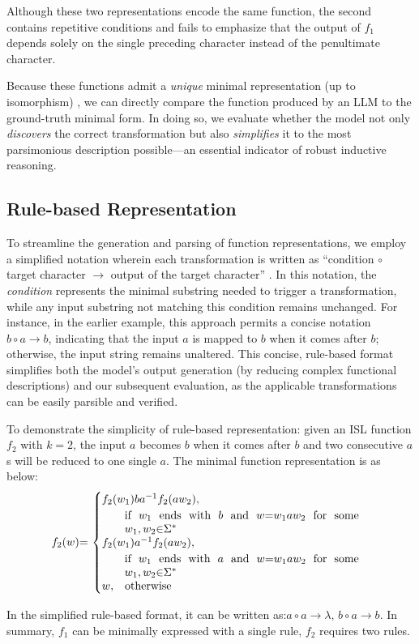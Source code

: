 Although these two representations encode the same function, the second contains repetitive conditions and fails to emphasize that the output of $f_1$ depends solely on the single preceding character instead of the penultimate character. 

Because these functions admit a \emph{unique} minimal representation (up to isomorphism) \citep{chandlee2014learning, oncina1991inductive}, we can directly compare the function produced by an LLM to the ground-truth minimal form. In doing so, we evaluate whether the model not only \emph{discovers} the correct transformation but also \emph{simplifies} it to the most parsimonious description possible—an essential indicator of robust inductive reasoning.

\subsection{Rule-based Representation}
To streamline the generation and parsing of function representations, we employ a simplified notation wherein each transformation is written as ``condition $\circ$ target character $\to$ output of the target character'' \citep{bird1994one}.  In this notation, the \emph{condition} represents the minimal substring needed to trigger a transformation, while any input substring not matching this condition remains unchanged. For instance, in the earlier example, this approach permits a concise notation $b\circ a\to b$, indicating that the input $a$ is mapped to $b$ when it comes after $b$; otherwise, the input string remains unaltered. This concise, rule-based format simplifies both the model's output generation (by reducing complex functional descriptions) and our subsequent evaluation, as the applicable transformations can be easily parsible and verified.

To demonstrate the simplicity of rule-based representation: given an ISL function $f_2$ with $k=2$, the input $a$ becomes $b$ when it comes after $b$ and two consecutive $a$s will be reduced to one single $a$. The minimal function representation is as below:
\begin{equation}
\hspace{-3mm} f_2(w) {=}\,
  \begin{cases}
 f_2(w_1)ba^{-1}f_2(aw_2), \\
 \quad\quad \parbox[t]{0.6\linewidth}{
        if $w_1$ ends with $b$ and 
        $w {=}w_1aw_2$ for some $w_1, w_2 {\in} \Sigma^*$
      }\\
 f_2(w_1)a^{-1}f_2(aw_2), \\
 \quad\quad \parbox[t]{0.6\linewidth}{
        if $w_1$ ends with $a$ and 
        $w {=}w_1aw_2$ for some $w_1, w_2 {\in} \Sigma^*$
      }\\
 w, \,\,\,\,\, \text{otherwise}
  \end{cases}
\hspace{-10pt} 
\end{equation}

In the simplified rule-based format, it can be written as:$a\circ a\to\lambda\text{, }b\circ a\to b$. In summary, $f_1$ can be minimally expressed with a single rule, $f_2$ requires two rules.

